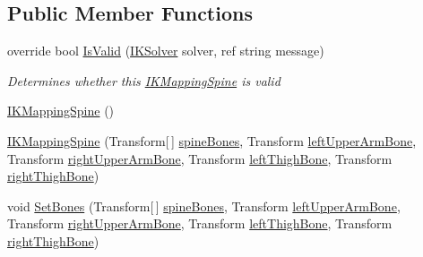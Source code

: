 \subsection*{Public Member Functions}
\begin{DoxyCompactItemize}
\item 
override bool \mbox{\hyperlink{class_root_motion_1_1_final_i_k_1_1_i_k_mapping_spine_ab93a1e51b71ee23679b83bd407976f9d}{Is\+Valid}} (\mbox{\hyperlink{class_root_motion_1_1_final_i_k_1_1_i_k_solver}{I\+K\+Solver}} solver, ref string message)
\begin{DoxyCompactList}\small\item\em Determines whether this \mbox{\hyperlink{class_root_motion_1_1_final_i_k_1_1_i_k_mapping_spine}{I\+K\+Mapping\+Spine}} is valid \end{DoxyCompactList}\item 
\mbox{\hyperlink{class_root_motion_1_1_final_i_k_1_1_i_k_mapping_spine_aee02f0b53f6942ffec03dfd1f7461c39}{I\+K\+Mapping\+Spine}} ()
\item 
\mbox{\hyperlink{class_root_motion_1_1_final_i_k_1_1_i_k_mapping_spine_ab5dd2c416b2a46aa2687850d8182af37}{I\+K\+Mapping\+Spine}} (Transform\mbox{[}$\,$\mbox{]} \mbox{\hyperlink{class_root_motion_1_1_final_i_k_1_1_i_k_mapping_spine_ab118efa5b19ede201002f31e4040c41e}{spine\+Bones}}, Transform \mbox{\hyperlink{class_root_motion_1_1_final_i_k_1_1_i_k_mapping_spine_a474883eb91e524d854fde7a4786ec45d}{left\+Upper\+Arm\+Bone}}, Transform \mbox{\hyperlink{class_root_motion_1_1_final_i_k_1_1_i_k_mapping_spine_aa3fa6d5057535615fb2192b6b15dd126}{right\+Upper\+Arm\+Bone}}, Transform \mbox{\hyperlink{class_root_motion_1_1_final_i_k_1_1_i_k_mapping_spine_a3ece51db8feeabba8019c7bd7422bdfc}{left\+Thigh\+Bone}}, Transform \mbox{\hyperlink{class_root_motion_1_1_final_i_k_1_1_i_k_mapping_spine_a83f31f3639f4c4c5144f0a45a7341b64}{right\+Thigh\+Bone}})
\item 
void \mbox{\hyperlink{class_root_motion_1_1_final_i_k_1_1_i_k_mapping_spine_aefe05c1be4d51067c2165e450f300c1f}{Set\+Bones}} (Transform\mbox{[}$\,$\mbox{]} \mbox{\hyperlink{class_root_motion_1_1_final_i_k_1_1_i_k_mapping_spine_ab118efa5b19ede201002f31e4040c41e}{spine\+Bones}}, Transform \mbox{\hyperlink{class_root_motion_1_1_final_i_k_1_1_i_k_mapping_spine_a474883eb91e524d854fde7a4786ec45d}{left\+Upper\+Arm\+Bone}}, Transform \mbox{\hyperlink{class_root_motion_1_1_final_i_k_1_1_i_k_mapping_spine_aa3fa6d5057535615fb2192b6b15dd126}{right\+Upper\+Arm\+Bone}}, Transform \mbox{\hyperlink{class_root_motion_1_1_final_i_k_1_1_i_k_mapping_spine_a3ece51db8feeabba8019c7bd7422bdfc}{left\+Thigh\+Bone}}, Transform \mbox{\hyperlink{class_root_motion_1_1_final_i_k_1_1_i_k_mapping_spine_a83f31f3639f4c4c5144f0a45a7341b64}{right\+Thigh\+Bone}})

\end{DoxyCompactItemize}
